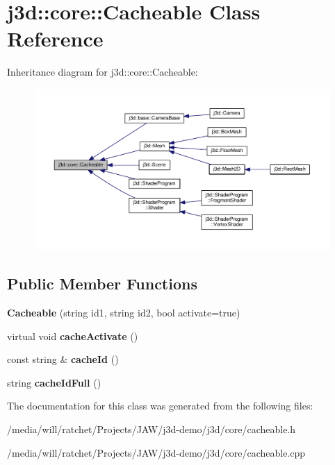 \hypertarget{classj3d_1_1core_1_1Cacheable}{}\section{j3d\+:\+:core\+:\+:Cacheable Class Reference}
\label{classj3d_1_1core_1_1Cacheable}


Inheritance diagram for j3d\+:\+:core\+:\+:Cacheable\+:
\nopagebreak
\begin{figure}[H]
\begin{center}
\leavevmode
\includegraphics[width=350pt]{classj3d_1_1core_1_1Cacheable__inherit__graph}
\end{center}
\end{figure}
\subsection*{Public Member Functions}
\begin{DoxyCompactItemize}
\item 
\hypertarget{classj3d_1_1core_1_1Cacheable_ae1516b4f52227e68d6f58f19c4e365a1}{}{\bfseries Cacheable} (string id1, string id2, bool activate=true)\label{classj3d_1_1core_1_1Cacheable_ae1516b4f52227e68d6f58f19c4e365a1}

\item 
\hypertarget{classj3d_1_1core_1_1Cacheable_a027be45ddd07ac6d7fef24eb6b1d23e5}{}virtual void {\bfseries cache\+Activate} ()\label{classj3d_1_1core_1_1Cacheable_a027be45ddd07ac6d7fef24eb6b1d23e5}

\item 
\hypertarget{classj3d_1_1core_1_1Cacheable_a946246c166ba446dbded6dda27a669e3}{}const string \& {\bfseries cache\+Id} ()\label{classj3d_1_1core_1_1Cacheable_a946246c166ba446dbded6dda27a669e3}

\item 
\hypertarget{classj3d_1_1core_1_1Cacheable_aac11f2d4cc407ae3f8ea4c9f56712d9a}{}string {\bfseries cache\+Id\+Full} ()\label{classj3d_1_1core_1_1Cacheable_aac11f2d4cc407ae3f8ea4c9f56712d9a}

\end{DoxyCompactItemize}


The documentation for this class was generated from the following files\+:\begin{DoxyCompactItemize}
\item 
/media/will/ratchet/\+Projects/\+J\+A\+W/j3d-\/demo/j3d/core/cacheable.\+h\item 
/media/will/ratchet/\+Projects/\+J\+A\+W/j3d-\/demo/j3d/core/cacheable.\+cpp\end{DoxyCompactItemize}
